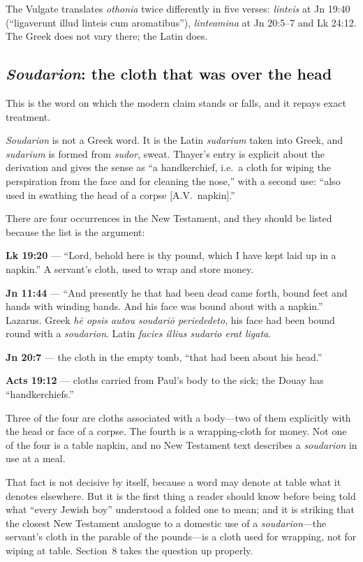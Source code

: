 The Vulgate translates \emph{othonia} twice differently in five verses:
\emph{linteis} at Jn 19:40 (``ligaverunt illud linteis cum aromatibus''),
\emph{linteamina} at Jn 20:5--7 and Lk 24:12. The Greek does not vary there;
the Latin does.

\subsection{\emph{Soudarion}: the cloth that was over the head}

This is the word on which the modern claim stands or falls, and it repays
exact treatment.

\emph{Soudarion} is not a Greek word. It is the Latin \emph{sudarium} taken
into Greek, and \emph{sudarium} is formed from \emph{sudor}, sweat. Thayer's
entry is explicit about the derivation and gives the sense as ``a handkerchief,
i.e.\ a cloth for wiping the perspiration from the face and for cleaning the
nose,'' with a second use: ``also used in swathing the head of a corpse [A.V.\
napkin].''

There are four occurrences in the New Testament, and they should be listed
because the list is the argument:

\begin{studyframe}\small
\textbf{Lk 19:20} --- ``Lord, behold here is thy pound, which I have kept laid
up in a napkin.'' A servant's cloth, used to wrap and store money.

\textbf{Jn 11:44} --- ``And presently he that had been dead came forth, bound
feet and hands with winding bands. And his face was bound about with a
napkin.'' Lazarus. Greek \emph{h\=e opsis autou soudari\=o periededeto}, his
face had been bound round with a \emph{soudarion}. Latin \emph{facies illius
sudario erat ligata}.

\textbf{Jn 20:7} --- the cloth in the empty tomb, ``that had been about his
head.''

\textbf{Acts 19:12} --- cloths carried from Paul's body to the sick; the Douay
has ``handkerchiefs.''
\end{studyframe}

Three of the four are cloths associated with a body---two of them explicitly
with the head or face of a corpse. The fourth is a wrapping-cloth for money.
Not one of the four is a table napkin, and no New Testament text describes a
\emph{soudarion} in use at a meal.

That fact is not decisive by itself, because a word may denote at table what it
denotes elsewhere. But it is the first thing a reader should know before being
told what ``every Jewish boy'' understood a folded one to mean; and it is
striking that the closest New Testament analogue to a domestic use of a
\emph{soudarion}---the servant's cloth in the parable of the pounds---is a
cloth used for wrapping, not for wiping at table. Section~8 takes the question
up properly.


